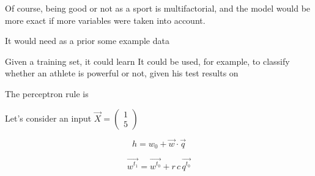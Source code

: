 \newpage




Of course, being good or not as a sport is multifactorial, and the model would be more exact if more variables were taken into account. 




It would need as a prior some example data

Given a training set, it could learn
It could be used, for example, to classify whether an athlete is powerful or not, given his test results on 

The perceptron rule is 


Let's consider an input \(\overrightarrow{X} = \begin{pmatrix} 1 \\ 5 \end{pmatrix} \)

\begin{equation} 
      h = w_0 + \overrightarrow{w} \cdot \overrightarrow{q} 
\end{equation}
      
\begin{equation} 
      \overrightarrow{w^{t_1}} = \overrightarrow{w^{t_0}} + r\, c\, \overrightarrow{q^{t_0}} 
\end{equation}
      
